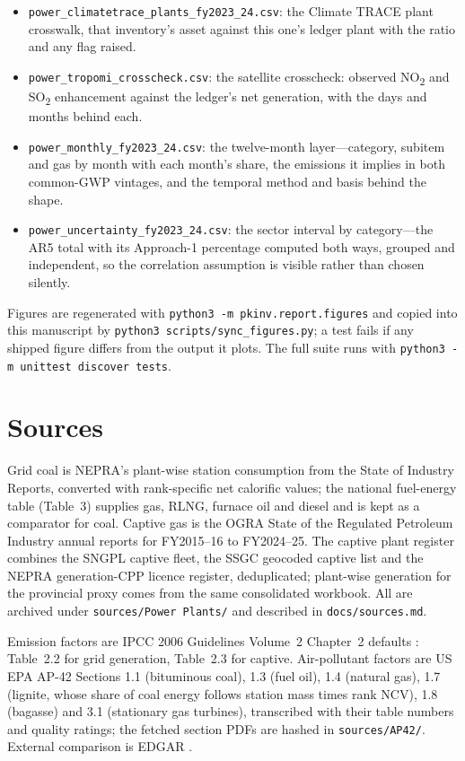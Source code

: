 \begin{itemize}
\item \texttt{power\_\allowbreak climatetrace\_\allowbreak plants\_\allowbreak fy2023\_\allowbreak 24.csv}: the Climate TRACE plant crosswalk, that inventory's asset against this one's ledger plant with the ratio and any flag raised.
\item \texttt{power\_\allowbreak tropomi\_\allowbreak crosscheck.csv}: the satellite crosscheck: observed NO\textsubscript{2} and SO\textsubscript{2} enhancement against the ledger's net generation, with the days and months behind each.
\item \texttt{power\_\allowbreak monthly\_\allowbreak fy2023\_\allowbreak 24.csv}: the twelve-month layer---category, subitem and gas by month with each month's share, the emissions it implies in both common-GWP vintages, and the temporal method and basis behind the shape.
\item \texttt{power\_\allowbreak uncertainty\_\allowbreak fy2023\_\allowbreak 24.csv}: the sector interval by category---the AR5 total with its Approach-1 percentage computed both ways, grouped and independent, so the correlation assumption is visible rather than chosen silently.
\end{itemize}

Figures are regenerated with \texttt{python3 -m pkinv.report.figures} and copied into this
manuscript by \texttt{python3 scripts/sync\_figures.py}; a test fails if any shipped figure
differs from the output it plots. The full suite runs with
\texttt{python3 -m unittest discover tests}.

\section{Sources}
\label{app:sources}

Grid coal is NEPRA's plant-wise station consumption from the State of Industry Reports,
converted with rank-specific net calorific values; the national fuel-energy table (Table~3) supplies
gas, RLNG, furnace oil and diesel and is kept as a comparator for coal. Captive gas is the OGRA State of the
Regulated Petroleum Industry annual reports for FY2015--16 to FY2024--25. The captive plant register combines
the SNGPL captive fleet, the SSGC geocoded captive list and the NEPRA generation-CPP licence
register, deduplicated; plant-wise generation for the provincial proxy comes from the same
consolidated workbook. All are archived under \texttt{sources/Power Plants/} and described in
\texttt{docs/sources.md}.

Emission factors are IPCC 2006 Guidelines Volume~2 Chapter~2 defaults \citep{ipcc2006stationary}:
Table~2.2 for grid generation, Table~2.3 for captive. Air-pollutant factors are US EPA AP-42
Sections 1.1 (bituminous coal), 1.3 (fuel oil), 1.4 (natural gas), 1.7 (lignite, whose share of coal energy follows station mass times rank NCV), 1.8 (bagasse) and 3.1 (stationary gas
turbines), transcribed with their table numbers and quality ratings; the fetched section
PDFs are hashed in \texttt{sources/AP42/}. External
comparison is EDGAR \citep{edgar2025booklet}.
